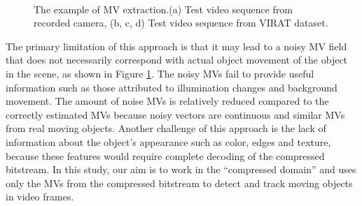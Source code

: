 \begin{figure}
\centering
{}
\\
 \caption{ The example of MV extraction.(a) Test video sequence from recorded camera, (b, c, d) Test video sequence from VIRAT dataset.}
 \label{fig:noise}
\end{figure}

The primary limitation of this approach is that it may lead to a noisy MV field that does not necessarily correspond with actual object movement of the object in the scene, as shown in Figure \ref{fig:noise}. The noisy MVs fail to provide useful information such as those attributed to illumination changes and background movement. The amount of noise MVs is relatively reduced compared to the correctly estimated MVs because noisy vectors are continuous and similar MVs from real moving objects. Another challenge of this approach is the lack of information about the object’s appearance such as color, edges and texture, because these features would require complete decoding of the compressed bitstream. In this study, our aim is to work in the “compressed domain” and uses only the MVs from the compressed bitstream to detect and track moving objects in video frames. 


